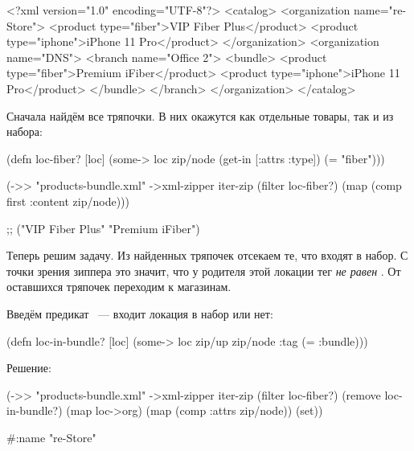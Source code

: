 \begin{english}
  \begin{xml/lines}
<?xml version="1.0" encoding="UTF-8"?>
<catalog>
  <organization name="re-Store">
    <product type="fiber">VIP Fiber Plus</product>
    <product type="iphone">iPhone 11 Pro</product>
  </organization>
  <organization name="DNS">
    <branch name="Office 2">
      <bundle>
        <product type="fiber">Premium iFiber</product>
        <product type="iphone">iPhone 11 Pro</product>
      </bundle>
    </branch>
  </organization>
</catalog>
  \end{xml/lines}
\end{english}

Сначала найдём все тряпочки. В них окажутся как отдельные товары, так и из
набора:

\begin{english}
  \begin{clojure}
(defn loc-fiber? [loc]
  (some-> loc
          zip/node
          (get-in [:attrs :type])
          (= "fiber")))

(->> "products-bundle.xml"
     ->xml-zipper
     iter-zip
     (filter loc-fiber?)
     (map (comp first :content zip/node)))

;; ("VIP Fiber Plus" "Premium iFiber")
  \end{clojure}
\end{english}

Теперь решим задачу. Из найденных тряпочек отсекаем те, что входят в набор. С
точки зрения зиппера это значит, что у родителя этой локации тег \emph{не равен}
. От оставшихся тряпочек переходим к магазинам.

Введём предикат ~--- входит локация в набор или нет:

\begin{english}
  \begin{clojure}
(defn loc-in-bundle?
  [loc]
  (some-> loc
          zip/up
          zip/node
          :tag
          (= :bundle)))
  \end{clojure}
\end{english}

Решение:

\begin{english}
  \begin{clojure}
(->> "products-bundle.xml"
     ->xml-zipper
     iter-zip
     (filter loc-fiber?)
     (remove loc-in-bundle?)
     (map loc->org)
     (map (comp :attrs zip/node))
     (set))

#{{:name "re-Store"}}
  \end{clojure}
\end{english}


